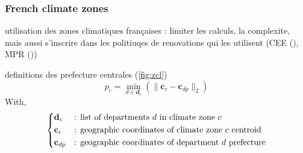 \documentclass[11pt]{article}
\begin{document}
        \subsubsection{French climate zones} %
        \label{ssub:french_climate_zones}

        utilisation des zones climatiques françaises : limiter les calculs, la complexite, mais aussi s'inscrire dans les politiuqes de renovations qui les utilisent (CEE (\cite{ademe_french_2011}), MPR (\cite{anah_aides_2024}))

        definitions des prefecture centrales (\ref{fig:zcl})
        \begin{equation}
            \label{eq:pref_centr}
            p_c = \min_{d \in \mathbf{d}_c} \left(\|\mathbf{c}_c - \mathbf{c}_{dp}\|_2 \right)
        \end{equation}
        With,
        $$
        \begin{dcases}
            \mathbf{d}_c&\text{: list of departments $d$ in climate zone $c$}\\
            \mathbf{c}_c&\text{: geographic coordinates of climate zone $c$ centroid}\\
            \mathbf{c}_{dp}&\text{: geographic coordinates of department $d$ prefecture}\\
        \end{dcases}
        $$
\end{document}
